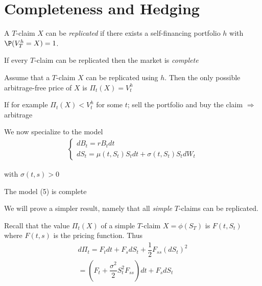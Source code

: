 \section{Completeness and Hedging}
\begin{defo}[]{}
  A $T$-claim $X$ can be \textit{replicated} if there exists a self-financing portfolio $h$ with $\P(V_T^h = X) = 1$.\par
  \noindent If every $T$-claim can be replicated then the market is \textit{complete}
\end{defo}
\par\bigskip
\begin{theo}[]{}
  Assume that a $T$-claim $X$ can be replicated using $h$. Then the only possible arbitrage-free price of $X$ is $\Pi_t(X) = V_t^h$
\end{theo}
\par\bigskip
\begin{prf}[]{}
  If for example $\Pi_t(X)<V_t^h$ for some $t$; sell the portfolio and buy the claim $\Rightarrow$ arbitrage
\end{prf}
\par\bigskip
\noindent We now specialize to the model
\begin{equation}
  \begin{gathered}
    \begin{cases}
      dB_t = rB_tdt\\
      dS_t = \mu(t,S_t)S_tdt + \sigma(t,S_t)S_tdW_t
    \end{cases}
  \end{gathered}
\end{equation}\par
\noindent with $\sigma(t,s)>0$
\par\bigskip
\begin{theo}[]{}
  The model (5) is complete
\end{theo}
\par\bigskip
\noindent We will prove a simpler result, namely that all \textit{simple} $T$-claims can be replicated.\par
\noindent Recall that the value $\Pi_t(X)$ of a simple $T$-claim $X = \phi(S_T)$ is $F(t,S_t)$ where $F(t,s)$ is the pricing function. Thus
\begin{equation*}
  \begin{gathered}
    d\Pi_t = F_tdt+F_sdS_t + \dfrac{1}{2}F_{ss}(dS_t)^2\\
    = \left(F_t + \dfrac{\sigma^2}{2}S_t^2F_{ss}\right)dt + F_sdS_t
  \end{gathered}
\end{equation*}\par

